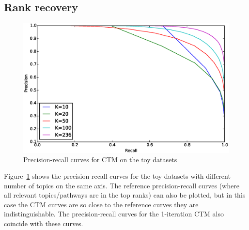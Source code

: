 \documentclass[12pt,a4paper,twoside,openright]{report}
\begin{document}
%
%

\subsection{Rank recovery}

\begin{figure}[!htb]
\includegraphics[width=\textwidth]{sim-pr-curves-all.eps}
\caption{Precision-recall curves for CTM on the toy datasets}
\label{fig:sim-pr-curves-all}
\end{figure}

Figure~\ref{fig:sim-pr-curves-all} shows the precision-recall curves for the toy datasets with different number of topics on the same axis. The reference precision-recall curves (where all relevant topics/pathways are in the top ranks) can also be plotted, but in this case the CTM curves are so close to the reference curves they are indistinguishable. The precision-recall curves for the 1-iteration CTM also coincide with these curves.
\end{document}
